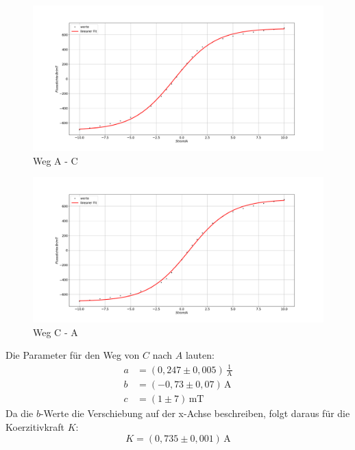\begin{figure}
\centering
\includegraphics[width=\textwidth]{plotkoertiv.pdf}
\caption{Weg A - C}
\label{fig:koe}
\end{figure}

\begin{figure}
\centering
\includegraphics[width=\textwidth]{plotkoertiv2.pdf}
\caption{Weg C - A}
\label{fig:koe2}
\end{figure}
Die Parameter für den Weg von $C$ nach $A$ lauten:
 \begin{align*}
   a &= (0,247 \pm 0,005) \, \mathrm{\frac{1}{A}}\\
   b &= (-0,73 \pm 0,07)\, \mathrm{A} \\
   c &= (1 \pm 7) \, \mathrm{mT}\,
 \end{align*}
 Da die $b$-Werte die Verschiebung auf der x-Achse beschreiben, folgt daraus für die Koerzitivkraft $K$:
 \begin{equation*}
   K = (0,735 \pm  0,001) \, \mathrm{A}
\end{equation*}


